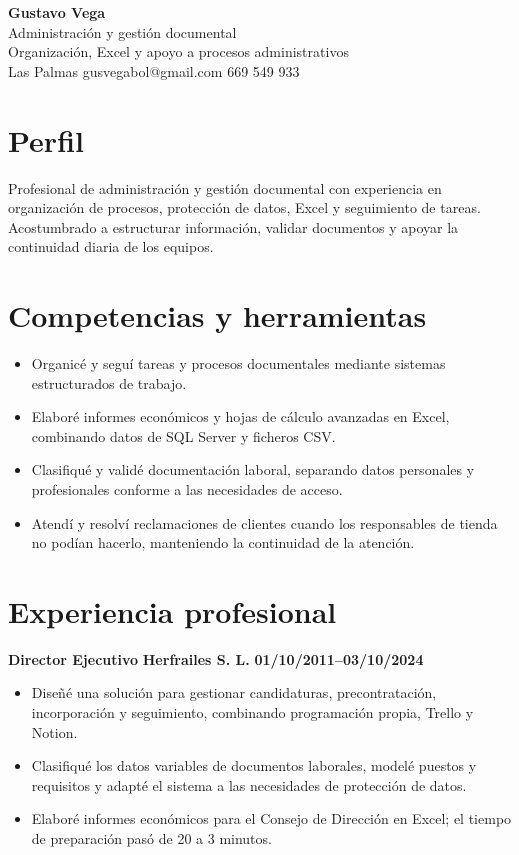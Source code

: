\documentclass[11pt,a4paper]{article}
\begin{document}
{\color{primary}\LARGE\textbf{Gustavo Vega}}\\
{\color{secondary}\large Administración y gestión documental}\\
{\color{secondary}\large Organización, Excel y apoyo a procesos administrativos}\\
Las Palmas \textbar{} gusvegabol@gmail.com \textbar{} 669 549 933

\section*{Perfil}
Profesional de administración y gestión documental con experiencia en organización de procesos, protección de datos, Excel y seguimiento de tareas. Acostumbrado a estructurar información, validar documentos y apoyar la continuidad diaria de los equipos.

\section*{Competencias y herramientas}
\begin{itemize}[leftmargin=*,nosep]
\item Organicé y seguí tareas y procesos documentales mediante sistemas estructurados de trabajo.
\item Elaboré informes económicos y hojas de cálculo avanzadas en Excel, combinando datos de SQL Server y ficheros CSV.
\item Clasifiqué y validé documentación laboral, separando datos personales y profesionales conforme a las necesidades de acceso.
\item Atendí y resolví reclamaciones de clientes cuando los responsables de tienda no podían hacerlo, manteniendo la continuidad de la atención.
\end{itemize}

\section*{Experiencia profesional}
\textbf{Director Ejecutivo} \textbar{} \textbf{Herfrailes S. L.} \textbar{} \textbf{01/10/2011–03/10/2024}
\begin{itemize}[leftmargin=*,nosep]
\item Diseñé una solución para gestionar candidaturas, precontratación, incorporación y seguimiento, combinando programación propia, Trello y Notion.
\item Clasifiqué los datos variables de documentos laborales, modelé puestos y requisitos y adapté el sistema a las necesidades de protección de datos.
\item Elaboré informes económicos para el Consejo de Dirección en Excel; el tiempo de preparación pasó de 20 a 3 minutos.
\end{itemize}
\end{document}
